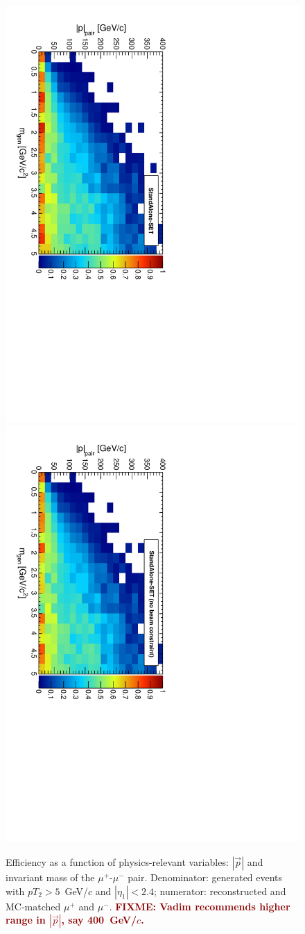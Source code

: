 \documentclass[12pt]{article}
\newcommand{\fixme}[1]{\textcolor{darkred}{\bf FIXME: #1}}
\begin{document}
\begin{figure}[p]
\includegraphics[height=0.5\linewidth, angle=90]{fig/acceptance_plot/pairpmagvsmass_StandAloneUpdatedSET.pdf}
\includegraphics[height=0.5\linewidth, angle=90]{fig/acceptance_plot/pairpmagvsmass_StandAloneSET.pdf}

\caption{Efficiency as a function of physics-relevant variables:
  $|\vec{p}|$ and invariant mass of the $\mu^+$-$\mu^-$ pair.
  Denominator: generated events with $pT_2 > 5$~GeV/$c$ and $|\eta_1|
  < 2.4$; numerator: reconstructed and MC-matched $\mu^+$ and $\mu^-$.
  \fixme{Vadim recommends higher range in $|\vec{p}|$, say
    400~GeV/$c$.} \label{fig:pairpmagvsmass}}
\end{figure}
\end{document}
